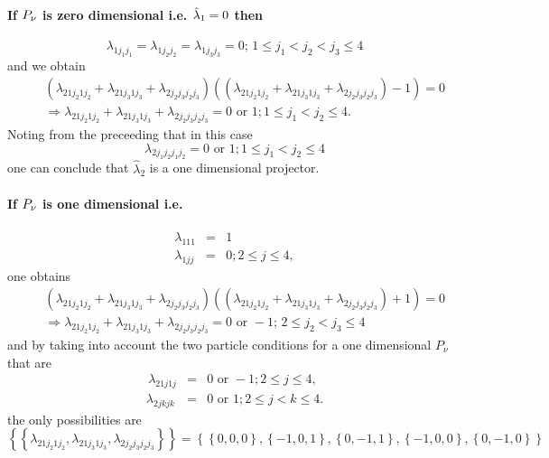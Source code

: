 \documentclass[12pt]{article}
\begin{document}
\paragraph{If $P_{\mathcal{\protect\nu }}$ is zero dimensional i.e. $\hat{%
\protect\lambda}_{1}=0$ then}

\begin{equation*}
\lambda _{1j_{1}j_{1}}=\lambda _{1j_{2}j_{2}}=\lambda
_{1j_{3}j_{3}}=0;\,1\leq j_{1}<j_{2}<j_{3}\leq 4
\end{equation*}%
and we obtain 
\begin{eqnarray*}
&&\left( \lambda _{21j_{2}1j_{2}}+\lambda _{21j_{3}1j_{3}}+\lambda
_{2j_{2}j_{3}j_{2}j_{3}}\right) \left( \left( \lambda
_{21j_{2}1j_{2}}+\lambda _{21j_{3}1j_{3}}+\lambda
_{2j_{2}j_{3}j_{2}j_{3}}\right) -1\right) =0 \\
&&\left. \Rightarrow \right. \lambda _{21j_{2}1j_{2}}+\lambda
_{21j_{3}1j_{3}}+\lambda _{2j_{2}j_{3}j_{2}j_{3}}=0\text{ or }1;1\leq
j_{1}<j_{2}\leq 4.
\end{eqnarray*}%
Noting from the preceeding that in this case 
\begin{equation*}
\lambda _{2j_{1}j_{2}j_{1}j_{2}}=0\text{ or }1;1\leq j_{1}<j_{2}\leq 4
\end{equation*}%
one can conclude that $\hat{\lambda}_{2}$ is a one dimensional projector.

\paragraph{If $P_{\mathcal{\protect\nu }}$ is one dimensional i.e.}

\begin{eqnarray*}
\lambda _{111} &=&1 \\
\lambda _{1jj} &=&0;2\leq j\leq 4,
\end{eqnarray*}%
one obtains%
\begin{eqnarray*}
&&\left( \lambda _{21j_{2}1j_{2}}+\lambda _{21j_{3}1j_{3}}+\lambda
_{2j_{2}j_{3}j_{2}j_{3}}\right) \left( \left( \lambda
_{21j_{2}1j_{2}}+\lambda _{21j_{3}1j_{3}}+\lambda
_{2j_{2}j_{3}j_{2}j_{3}}\right) +1\right) =0 \\
&&\left. \Rightarrow \right. \lambda _{21j_{2}1j_{2}}+\lambda
_{21j_{3}1j_{3}}+\lambda _{2j_{2}j_{3}j_{2}j_{3}}=0\text{ or }-1;\,2\leq
j_{2}<j_{3}\leq 4
\end{eqnarray*}%
and by taking into account the two particle conditions for a one dimensional 
$P_{\mathcal{\nu }}$ that are 
\begin{eqnarray*}
\,\lambda _{21j1j} &=&0\text{ or }-1;2\leq j\leq 4, \\
\lambda _{2jkjk} &=&0\text{ or }1;2\leq j<k\leq 4.
\end{eqnarray*}%
the only possibilities are 
\begin{equation*}
\left\{ \left\{ \lambda _{21j_{2}1j_{2}},\lambda _{21j_{3}1j_{3}},\lambda
_{2j_{2}j_{3}j_{2}j_{3}}\right\} \right\} =\left\{ \left\{ 0,0,0\right\}
,\left\{ -1,0,1\right\} ,\left\{ 0,-1,1\right\} ,\left\{ -1,0,0\right\}
,\left\{ 0,-1,0\right\} \right\}
\end{equation*}
\end{document}
